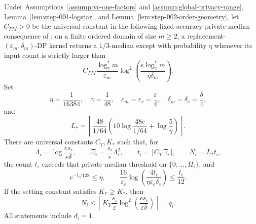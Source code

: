 \begin{lemma}
\label{lem:step-002-calibration}
Under Assumptions~\ref{assump:vc-one-factors} and
\ref{assump:global-privacy-range}, Lemma~\ref{lem:step-001-logstar}, and
Lemma~\ref{lem:step-002-order-geometry}, let \(C_{PM}>0\) be the universal
constant in the following fixed-accuracy private-median consequence of
\citet{yan2025vc1}: on a finite ordered domain of size \(m\ge2\), a
replacement-\((\varepsilon_m,\delta_m)\)-DP kernel returns a
\(1/3\)-median except with probability \(\eta\) whenever its input count is
strictly larger than
\[
C_{PM}\frac{\log_2^*m}{\varepsilon_m}
\log^2\!\left(\frac{e\log_2^*m}{\eta\delta_m}\right).
\]
Set
\begin{equation}\label{eq:step-002-fixed-calibration}
\eta=\frac1{16384},\quad \gamma=\frac1{48},\quad
\varepsilon_m=\varepsilon_c=\frac\varepsilon4,\quad
\delta_m=\delta_c=\frac\delta4,
\end{equation}
and
\begin{equation}\label{eq:step-002-block-size}
L_*=\left\lceil
\frac{48}{1/64}
\left(10\log\frac{48e}{1/64}+\log\frac5\gamma\right)
\right\rceil.
\end{equation}
There are universal constants \(C_T,K_*\) such that, for
\begin{equation}\label{eq:step-002-counts}
\Lambda_i=\log\frac{es_i}{\varepsilon\delta},\qquad
\Xi_i=\frac{s_i}{\varepsilon}\Lambda_i^2,
\qquad t_i=\lceil C_T\Xi_i\rceil,\qquad N_i=L_*t_i,
\end{equation}
the count \(t_i\) exceeds that private-median threshold on
\(\{0,\ldots,H_i\}\), and
\begin{equation}\label{eq:step-002-calibration-conclusions}
e^{-t_i/128}\le\eta,\qquad
\frac{16}{\varepsilon_c}
\log\!\left(\frac{4t_i}{\eta\varepsilon_c\delta_c}\right)
\le\frac{t_i}{12}.
\end{equation}
If the setting constant satisfies \(K_Y\ge K_*\), then
\begin{equation}\label{eq:step-002-quota-domination}
N_i\le
\left\lceil K_Y\frac{s_i}{\varepsilon}
\log^2\!\left(\frac{es_i}{\varepsilon\delta}\right)\right\rceil=q_i.
\end{equation}
All statements include \(d_i=1\).
\end{lemma}

